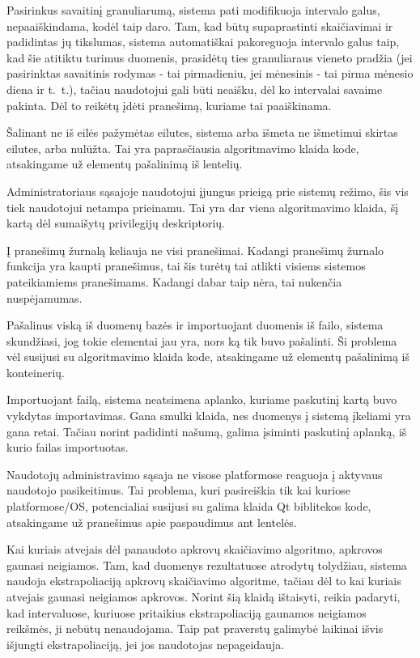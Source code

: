 {
  Pasirinkus savaitinį granuliarumą, sistema pati modifikuoja intervalo
  galus, nepaaiškindama, kodėl taip daro.
}
{
  Tam, kad būtų supaprastinti skaičiavimai ir padidintas jų tikslumas,
  sistema automatiškai pakoreguoja intervalo galus taip, kad šie atitiktu
  turimus duomenis, prasidėtų ties granuliaraus vieneto pradžia (jei
  pasirinktas savaitinis rodymas - tai pirmadieniu, jei mėnesinis - tai
  pirma mėnesio diena ir t.~t.), tačiau naudotojui gali būti neaišku, dėl
  ko intervalai savaime pakinta. Dėl to reikėtų įdėti pranešimą, kuriame tai
  paaiškinama.
}

{
  Šalinant ne iš eilės pažymėtas eilutes, sistema arba išmeta ne išmetimui
  skirtas eilutes, arba nulūžta.
}
{
  Tai yra paprasčiausia algoritmavimo klaida kode, atsakingame už elementų
  pašalinimą iš lentelių.
}

{
  Administratoriaus sąsajoje naudotojui įjungus prieigą prie sistemų
  režimo, šis vis tiek naudotojui netampa prieinamu.
}
{
  Tai yra dar viena algoritmavimo klaida, šį kartą dėl sumaišytų privilegijų
  deskriptorių.
}

{
  Į pranešimų žurnalą keliauja ne visi pranešimai.
}
{
  Kadangi pranešimų žurnalo funkcija yra kaupti pranešimus, tai šis turėtų tai atlikti
  visiems sistemos pateikiamiems pranešimams. Kadangi dabar taip nėra, tai nukenčia
  nuspėjamumas.
}

{
  Pašalinus viską iš duomenų bazės ir importuojant duomenis iš failo,
  sistema skundžiasi, jog tokie elementai jau yra, nors ką tik buvo pašalinti.
}
{
  Ši problema vėl susijusi su algoritmavimo klaida kode, atsakingame už
  elementų pašalinimą iš konteinerių.
}

{
  Importuojant failą, sistema neatsimena aplanko, kuriame paskutinį
  kartą buvo vykdytas importavimas.
}
{
  Gana smulki klaida, nes duomenys į sistemą įkeliami yra gana retai. Tačiau norint
  padidinti našumą, galima įsiminti paskutinį aplanką, iš kurio failas importuotas.
}

{
  Naudotojų administravimo sąsaja ne visose platformose reaguoja į
  aktyvaus naudotojo pasikeitimus.
}
{
  Tai problema, kuri pasireiškia tik kai kuriose platformose/OS, potencialiai susijusi
  su galima klaida Qt biblitekos kode, atsakingame už pranešimus apie paspaudimus ant 
  lentelės.
}

{
  Kai kuriais atvejais dėl panaudoto apkrovų skaičiavimo algoritmo,
  apkrovos gaunasi neigiamos.
}
{
  Tam, kad duomenys rezultatuose atrodytų tolydžiau, sistema naudoja
  ekstrapoliaciją apkrovų skaičiavimo algoritme, tačiau dėl to kai kuriais
  atvejais gaunasi neigiamos apkrovos. Norint šią klaidą ištaisyti, reikia
  padaryti, kad intervaluose, kuriuose pritaikius ekstrapoliaciją gaunamos
  neigiamos reikšmės, ji nebūtų nenaudojama. Taip pat praverstų galimybė
  laikinai išvis išjungti ekstrapoliaciją, jei jos naudotojas nepageidauja.
}
